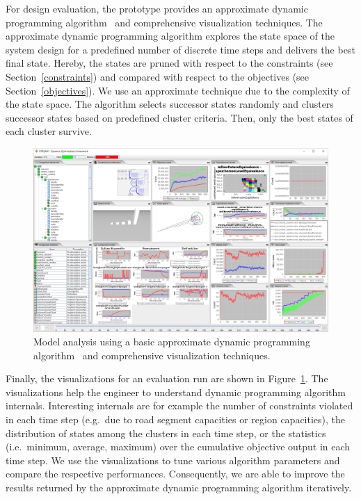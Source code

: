 For design evaluation, the prototype provides an approximate dynamic programming algorithm~\cite{Bertsekas1995} and comprehensive visualization techniques. The approximate dynamic programming algorithm explores the state space of the system design for a predefined number of discrete time steps and delivers the best final state. Hereby, the states are pruned with respect to the constraints (see Section~\ref{constraints}) and compared with respect to the objectives (see Section~\ref{objectives}). We use an approximate technique due to the complexity of the state space. The algorithm selects successor states randomly and clusters successor states based on predefined cluster criteria. Then, only the best states of each cluster survive.

\begin{figure}[h]
	\includegraphics[width=\columnwidth]{./gfx/analysis.png}
	\caption{Model analysis using a basic approximate dynamic programming algorithm~\cite{Bertsekas1995} and comprehensive visualization techniques.}
	\label{figure:analysis}
\end{figure}

Finally, the visualizations for an evaluation run are shown in Figure~\ref{figure:analysis}. The visualizations help the engineer to understand dynamic programming algorithm internals. Interesting internals are for example the number of constraints violated in each time step (e.g.\ due to road segment capacities or region capacities), the distribution of states among the clusters in each time step, or the statistics (i.e.\ minimum, average, maximum) over the cumulative objective output in each time step. We use the visualizations to tune various algorithm parameters and compare the respective performances. Consequently, we are able to improve the results returned by the approximate dynamic programming algorithm iteratively.


